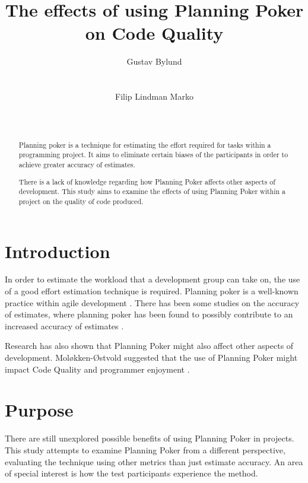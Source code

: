\documentclass{sigchi}
\begin{document}
\title{The effects of using Planning Poker on Code Quality}

\author{
  \alignauthor Gustav Bylund\\
  \\
    \\
  \alignauthor Filip Lindman Marko\\
    \\
    \\
}

\maketitle


\begin{abstract}
Planning poker is a technique for estimating the effort required for tasks
within a programming project. It aims to eliminate certain biases of
the participants in order to achieve greater accuracy of estimates\cite{grenning2002planning}.

There is a lack of knowledge regarding how Planning Poker affects other aspects of development. This study aims to examine the effects of using Planning Poker within a project on the quality of code produced.
\end{abstract}


\section{Introduction}
In order to estimate the workload  that a development group can take on, the use of a good effort estimation technique is required. Planning poker is a well-known practice within agile development \cite{cohn2005agile}. There has been some studies on the accuracy of estimates, where planning poker has been found to possibly contribute to an increased accuracy of estimates \cite{molokken2008using,Mahni20122086,1667560}.

Research has also shown that Planning Poker might also affect other aspects of development. Moløkken-Østvold suggested that the use of Planning Poker might impact Code Quality and programmer enjoyment \cite{molokken2008using}.

\section{Purpose}
There are still unexplored possible benefits of using Planning Poker in projects.
This study attempts to examine Planning Poker from a different perspective, evaluating the technique using other metrics than just estimate accuracy. An area of special interest is how the test participants experience the method.
\end{document}
